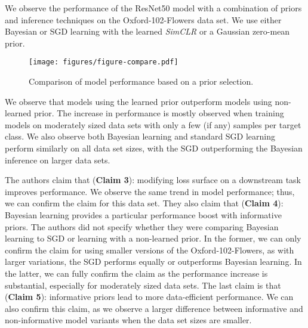 We observe the performance of the ResNet50 model with a combination of priors and inference techniques on the Oxford-102-Flowers data set. We use either Bayesian or SGD learning with the learned \textit{SimCLR} or a Gaussian zero-mean prior.

\begin{figure}[ht]
    \centering
    \texttt{[image: figures/figure-compare.pdf]}
    \caption{Comparison of model performance based on a prior selection.}
    \label{fig:prior}
\end{figure}

We observe that models using the learned prior outperform models using non-learned prior. The increase in performance is mostly observed when training models on moderately sized data sets with only a few (if any) samples per target class.
We also observe both Bayesian learning and standard SGD learning perform similarly on all data set sizes, with the SGD outperforming the Bayesian inference on larger data sets.

The authors claim that (\textbf{Claim 3}): modifying loss surface on a downstream task improves performance. We observe the same trend in model performance; thus, we can confirm the claim for this data set. They also claim that (\textbf{Claim 4}): Bayesian learning provides a particular performance boost with informative priors. The authors did not specify whether they were comparing Bayesian learning to SGD or learning with a non-learned prior. In the former, we can only confirm the claim for using smaller versions of the Oxford-102-Flowers, as with larger variations, the SGD performs equally or outperforms Bayesian learning.
In the latter, we can fully confirm the claim as the performance increase is substantial, especially for moderately sized data sets. The last claim is that (\textbf{Claim 5}): informative priors lead to more data-efficient performance. We can also confirm this claim, as we observe a larger difference between informative and non-informative model variants when the data set sizes are smaller.

 
